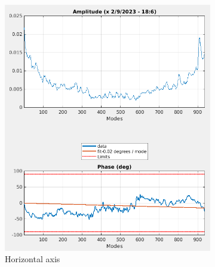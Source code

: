 \documentclass{report}
\begin{document}
 \begin{figure}[hbt]
   \centering
    \begin{subfigure}[b]{0.45\textwidth}
        \includegraphics[width=\textwidth]{vlr_modescan_x.png}
        \caption{Horizontal axis}
        \label{fig:modescan_example_x}
    \end{subfigure}
    \begin{subfigure}[b]{0.45\textwidth}

\end{subfigure}
\end{figure}
\end{document}
